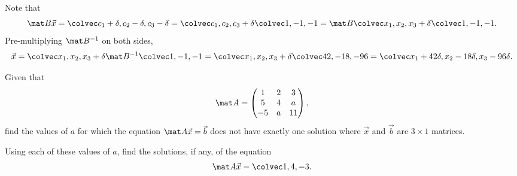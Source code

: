 \begin{solution}
    Note that \[\mat B \vec x = \cveciii{c_1 + \de}{c_2 - \de}{c_3 - \de} = \cveciii{c_1}{c_2}{c_3} + \de \cveciii1{-1}{-1} = \mat B \cveciii{x_1}{x_2}{x_3} + \de \cveciii1{-1}{-1}.\] Pre-multiplying $\mat B^{-1}$ on both sides, \[\vec x = \cveciii{x_1}{x_2}{x_3} + \de \mat B^{-1} \cveciii1{-1}{-1} = \cveciii{x_1}{x_2}{x_3} + \de \cveciii{42}{-18}{-96} = \cveciii{x_1 + 42\de}{x_2 - 18\de}{x_3 - 96\de}.\]
\end{solution}

\begin{problem}
    Given that \[\mat A = \begin{pmatrix}1 & 2 & 3 \\ 5 & 4 & a \\ -5 & a & 11\end{pmatrix},\] find the values of $a$ for which the equation $\mat A \vec x = \vec b$ does not have exactly one solution where $\vec x$ and $\vec b$ are $3 \times 1$ matrices.

    Using each of these values of $a$, find the solutions, if any, of the equation \[\mat A \vec x = \cveciii14{-3}.\]
\end{problem}

